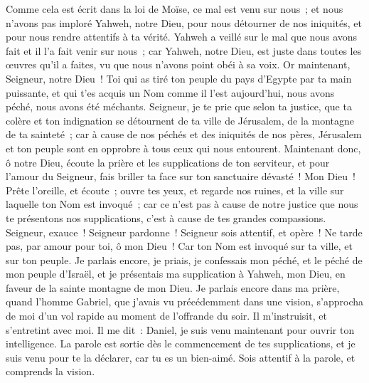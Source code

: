 \begin{multicols}{2}
Comme cela est écrit dans la loi de Moïse, ce mal est venu sur nous~; et nous n'avons pas imploré Yahweh, notre Dieu, pour nous détourner de nos iniquités, et pour nous rendre attentifs à ta vérité.
Yahweh a veillé sur le mal que nous avons fait et il l'a fait venir sur nous~; car Yahweh, notre Dieu, est juste dans toutes les œuvres qu'il a faites, vu que nous n'avons point obéi à sa voix.
Or maintenant, Seigneur, notre Dieu~! Toi qui as tiré ton peuple du pays d'Egypte par ta main puissante, et qui t'es acquis un Nom comme il l'est aujourd'hui, nous avons péché, nous avons été méchants.
Seigneur, je te prie que selon ta justice, que ta colère et ton indignation se détournent de ta ville de Jérusalem, de la montagne de ta sainteté~; car à cause de nos péchés et des iniquités de nos pères, Jérusalem et ton peuple sont en opprobre à tous ceux qui nous entourent.
Maintenant donc, ô notre Dieu, écoute la prière et les supplications de ton serviteur, et pour l'amour du Seigneur, fais briller ta face sur ton sanctuaire dévasté~!
Mon Dieu~! Prête l'oreille, et écoute~; ouvre tes yeux, et regarde nos ruines, et la ville sur laquelle ton Nom est invoqué~; car ce n'est pas à cause de notre justice que nous te présentons nos supplications, c'est à cause de tes grandes compassions.
Seigneur, exauce~! Seigneur pardonne~! Seigneur sois attentif, et opère~! Ne tarde pas, par amour pour toi, ô mon Dieu~! Car ton Nom est invoqué sur ta ville, et sur ton peuple.
Je parlais encore, je priais, je confessais mon péché, et le péché de mon peuple d'Israël, et je présentais ma supplication à Yahweh, mon Dieu, en faveur de la sainte montagne de mon Dieu.
Je parlais encore dans ma prière, quand l'homme Gabriel, que j'avais vu précédemment dans une vision, s'approcha de moi d'un vol rapide au moment de l'offrande du soir.
Il m'instruisit, et s'entretint avec moi. Il me dit~: Daniel, je suis venu maintenant pour ouvrir ton intelligence.
La parole est sortie dès le commencement de tes supplications, et je suis venu pour te la déclarer, car tu es un bien-aimé. Sois attentif à la parole, et comprends la vision.

\end{multicols}
